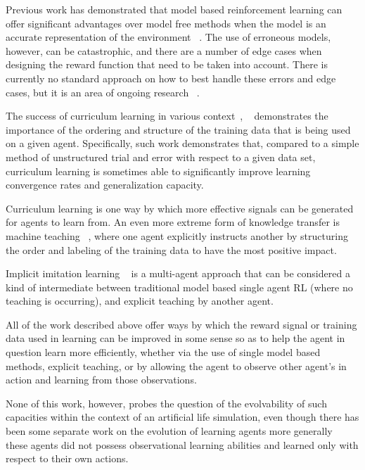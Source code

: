 \documentclass[letterpaper]{article}
\numberwithin{equation}{section}
\numberwithin{theorem}{section}
\numberwithin{lemma}{section}
\numberwithin{df}{section}
\begin{document}
Previous work has demonstrated that model based reinforcement learning can offer significant advantages over model free methods when the model is an accurate representation of the environment ~\cite{sutton1990integrated}. The use of erroneous models, however, can be catastrophic, and there are a number of edge cases when designing the reward function that need to be taken into account. There is currently no standard approach on how to best handle these errors and edge cases, but it is an area of ongoing research ~\cite{talvitie2018learning}.

The success of curriculum learning in various context~\cite{bengio2009curriculum}, ~\cite{graves2017automated} demonstrates the importance of the ordering and structure of the training data that is being used on a given agent. Specifically, such work demonstrates that, compared to a simple method of unstructured trial and error with respect to a given data set, curriculum learning is sometimes able to significantly improve learning convergence rates and generalization capacity.

Curriculum learning is one way by which more effective signals can be generated for agents to learn from. An even more extreme form of knowledge transfer is machine teaching ~\cite{simard2017machine}, where one agent explicitly instructs another by structuring the order and labeling of the training data to have the most positive impact.

Implicit imitation learning ~\cite{price2003accelerating} is a multi-agent approach that can be considered a kind of intermediate between traditional model based single agent RL (where no teaching is occurring), and explicit teaching by another agent.

All of the work described above offer ways by which the reward signal or training data used in learning can be improved in some sense so as to help the agent in question learn more efficiently, whether via the use of single model based methods, explicit teaching, or by allowing the agent to observe other agent's in action and learning from those observations.

None of this work, however, probes the question of the evolvability of such capacities within the context of an artificial life simulation, even though there has been some separate work on the evolution of learning agents more generally ~\cite{ackley1991interactions} these agents did not possess observational learning abilities and learned only with respect to their own actions.
\end{document}
